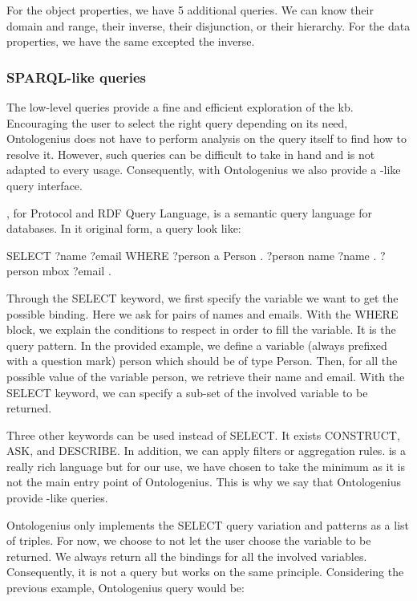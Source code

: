 For the object properties, we have 5 additional queries. We can know their domain and range, their inverse, their disjunction, or their hierarchy. For the data properties, we have the same excepted the inverse.

\subsubsection{SPARQL-like queries}

The low-level queries provide a fine and efficient exploration of the \acrshort{kb}. Encouraging the user to select the right query depending on its need, Ontologenius does not have to perform analysis on the query itself to find how to resolve it. However, such queries can be difficult to take in hand and is not adapted to every usage. Consequently, with Ontologenius we also provide a \sparql{}-like query interface.

\sparql{}, for \sparql{} Protocol and RDF Query Language, is a semantic query language for databases. In it original form, a \sparql{} query look like:

\begin{verbatimtab}
SELECT ?name 
       ?email
WHERE
  {
    ?person  a     Person .
    ?person  name  ?name .
    ?person  mbox  ?email .
  }
\end{verbatimtab}

Through the SELECT keyword, we first specify the variable we want to get the possible binding. Here we ask for pairs of names and emails. With the WHERE block, we explain the conditions to respect in order to fill the variable. It is the query pattern. In the provided example, we define a variable (always prefixed with a question mark) person which should be of type Person. Then, for all the possible value of the variable person, we retrieve their name and email. With the SELECT keyword, we can specify a sub-set of the involved variable to be returned.

Three other keywords can be used instead of SELECT. It exists CONSTRUCT, ASK, and DESCRIBE. In addition, we can apply filters or aggregation rules. \sparql{} is a really rich language but for our use, we have chosen to take the minimum as it is not the main entry point of Ontologenius. This is why we say that Ontologenius provide \sparql{}-like queries.

Ontologenius only implements the SELECT query variation and patterns as a list of triples. For now, we choose to not let the user choose the variable to be returned. We always return all the bindings for all the involved variables. Consequently, it is not a \sparql{} query but works on the same principle. Considering the previous example, Ontologenius query would be:

